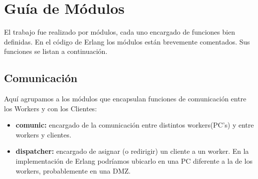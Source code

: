 \documentclass[12pt]{article}
\begin{document}
\section{Guía de Módulos}
El trabajo fue realizado por módulos, cada uno encargado de funciones bien definidas. En el código de Erlang los módulos están brevemente comentados. Sus funciones se listan a continuación.
\subsection{Comunicación}
Aquí agrupamos a los módulos que encapsulan funciones de comunicación entre los Workers y con los Clientes:
\begin{itemize}
\item \textbf{comunic:} encargado de la comunicación entre distintos workers(PC's) y entre workers y clientes.
\item \textbf{dispatcher:} encargado de asignar (o redirigir) un cliente a un worker. En la implementación de Erlang podríamos ubicarlo en una PC diferente a la de los workers, probablemente en una DMZ.
\end{itemize}
\end{document}
